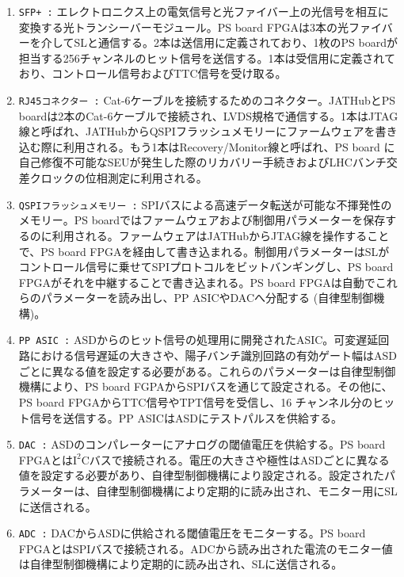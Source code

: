 \begin{enumerate}
    \item \texttt{SFP+ :} エレクトロニクス上の電気信号と光ファイバー上の光信号を相互に変換する光トランシーバーモジュール。PS board FPGAは3本の光ファイバーを介してSLと通信する。2本は送信用に定義されており、1枚のPS boardが担当する256チャンネルのヒット信号を送信する。1本は受信用に定義されており、コントロール信号およびTTC信号を受け取る。
    \baselineskip

    \item \texttt{RJ45コネクター :} Cat-6ケーブルを接続するためのコネクター。JATHubとPS boardは2本のCat-6ケーブルで接続され、LVDS規格で通信する。1本はJTAG線と呼ばれ、JATHubからQSPIフラッシュメモリーにファームウェアを書き込む際に利用される。もう1本はRecovery/Monitor線と呼ばれ、PS board に自己修復不可能なSEUが発生した際のリカバリー手続きおよびLHCバンチ交差クロックの位相測定に利用される。
    \baselineskip

    \item \texttt{QSPIフラッシュメモリー :} SPIバスによる高速データ転送が可能な不揮発性のメモリー。PS boardではファームウェアおよび制御用パラメーターを保存するのに利用される。ファームウェアはJATHubからJTAG線を操作することで、PS board FPGAを経由して書き込まれる。制御用パラメーターはSLがコントロール信号に乗せてSPIプロトコルをビットバンギングし、PS board FPGAがそれを中継することで書き込まれる。PS board FPGAは自動でこれらのパラメーターを読み出し、PP ASICやDACへ分配する (自律型制御機構)。
    \baselineskip

    \item \texttt{PP ASIC :} ASDからのヒット信号の処理用に開発されたASIC。可変遅延回路における信号遅延の大きさや、陽子バンチ識別回路の有効ゲート幅はASDごとに異なる値を設定する必要がある。これらのパラメーターは自律型制御機構により、PS board FGPAからSPIバスを通じて設定される。その他に、PS board FPGAからTTC信号やTPT信号を受信し、16 チャンネル分のヒット信号を送信する。PP ASICはASDにテストパルスを供給する。
    \baselineskip            

    \item \texttt{DAC :} ASDのコンパレーターにアナログの閾値電圧を供給する。PS board FPGAとは$\mathrm{I^{2}C}$バスで接続される。電圧の大きさや極性はASDごとに異なる値を設定する必要があり、自律型制御機構により設定される。設定されたパラメーターは、自律型制御機構により定期的に読み出され、モニター用にSLに送信される。
    \baselineskip

    \item  \texttt{ADC :} DACからASDに供給される閾値電圧をモニターする。PS board FPGAとはSPIバスで接続される。ADCから読み出された電流のモニター値は自律型制御機構により定期的に読み出され、SLに送信される。
    \baselineskip


\end{enumerate}
